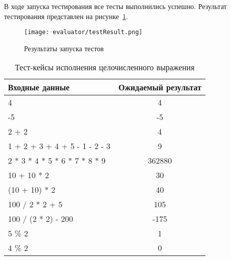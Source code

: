В ходе запуска тестирования все тесты выполнились успешно. Результат тестирования представлен на рисунке~\ref{f:testResult}.

\begin{figure}[ht]
    \centering
    \vspace{\toppaddingoffigure}
    \texttt{[image: evaluator/testResult.png]}
    \caption{Результаты запуска тестов}
    \label{f:testResult}
\end{figure}

\clearpage

\begin{table}[!ht]
    \Large
    \centering
    \begin{threeparttable}
        \caption{Тест-кейсы исполнения целочисленного выражения}
        \label{t:testCases_infixIntExpr}
        \begin{tabularx}{\textwidth}{|X|c|}
            \hline
            Входные данные                & Ожидаемый результат \\
            \hline
            4                             & 4                   \\
            \hline
            -5                            & -5                  \\
            \hline
            2 + 2                         & 4                   \\
            \hline
            1 + 2 + 3 + 4 + 5 - 1 - 2 - 3 & 9                   \\
            \hline
            2 * 3 * 4 * 5 * 6 * 7 * 8 * 9 & 362880              \\
            \hline
            10 + 10 * 2                   & 30                  \\
            \hline
            (10 + 10) * 2                 & 40                  \\
            \hline
            100 / 2 * 2 + 5               & 105                 \\
            \hline
            100 / (2 * 2) - 200           & -175                \\
            \hline
            5 \% 2                        & 1                   \\
            \hline
            4 \% 2                        & 0                   \\
            \hline
        \end{tabularx}
    \end{threeparttable}
    \vspace{\bottompaddingoftable}
\end{table}

